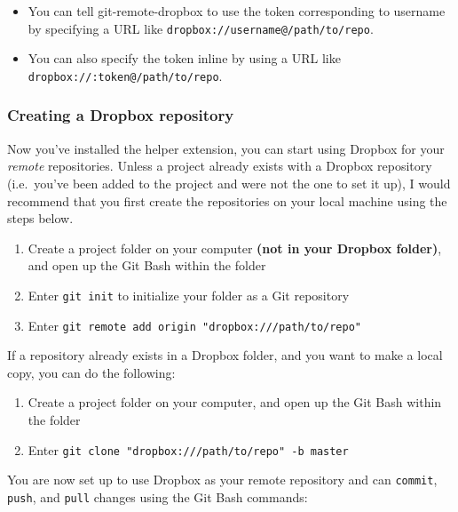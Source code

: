 \documentclass[]{book}
\providecommand{\tightlist}{%
  \setlength{\itemsep}{0pt}\setlength{\parskip}{0pt}}
\begin{document}
\begin{itemize}
\item
  You can tell git-remote-dropbox to use the token corresponding to username by specifying a URL like \texttt{dropbox://username@/path/to/repo}.
\item
  You can also specify the token inline by using a URL like \texttt{dropbox://:token@/path/to/repo}.
\end{itemize}

\hypertarget{creating-a-dropbox-repository}{%
\subsubsection{Creating a Dropbox repository}\label{creating-a-dropbox-repository}}

Now you've installed the helper extension, you can start using Dropbox for your \emph{remote} repositories. Unless a project already exists with a Dropbox repository (i.e.~you've been added to the project and were not the one to set it up), I would recommend that you first create the repositories on your local machine using the steps below.

\begin{enumerate}
\def\labelenumi{\arabic{enumi}.}
\tightlist
\item
  Create a project folder on your computer \textbf{(not in your Dropbox folder)}, and open up the Git Bash within the folder
\item
  Enter \texttt{git\ init} to initialize your folder as a Git repository
\item
  Enter \texttt{git\ remote\ add\ origin\ "dropbox:///path/to/repo"}
\end{enumerate}

If a repository already exists in a Dropbox folder, and you want to make a local copy, you can do the following:

\begin{enumerate}
\def\labelenumi{\arabic{enumi}.}
\tightlist
\item
  Create a project folder on your computer, and open up the Git Bash within the folder
\item
  Enter \texttt{git\ clone\ "dropbox:///path/to/repo"\ -b\ master}
\end{enumerate}

You are now set up to use Dropbox as your remote repository and can \texttt{commit}, \texttt{push}, and \texttt{pull} changes using the Git Bash commands:
\end{document}
